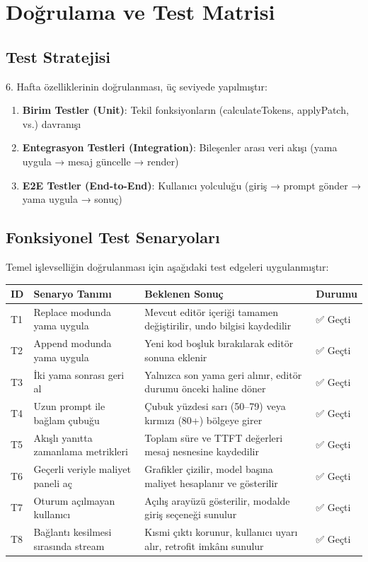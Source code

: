 \documentclass[12pt,a4paper]{article}
\begin{document}
\section{Doğrulama ve Test Matrisi}

\subsection{Test Stratejisi}

6. Hafta özelliklerinin doğrulanması, üç seviyede yapılmıştır:
\begin{enumerate}[leftmargin=*]
  \item \textbf{Birim Testler (Unit)}: Tekil fonksiyonların (calculateTokens, applyPatch, vs.) davranışı
  \item \textbf{Entegrasyon Testleri (Integration)}: Bileşenler arası veri akışı (yama uygula → mesaj güncelle → render)
  \item \textbf{E2E Testler (End-to-End)}: Kullanıcı yolculuğu (giriş → prompt gönder → yama uygula → sonuç)
\end{enumerate}

\subsection{Fonksiyonel Test Senaryoları}

Temel işlevselliğin doğrulanması için aşağıdaki test edgeleri uygulanmıştır:

\begin{longtable}{@{} P{0.9cm} P{3.8cm} P{4.8cm} P{2.0cm} @{}}
\toprule
ID & Senaryo Tanımı & Beklenen Sonuç & Durumu \\
\midrule
T1 & Replace modunda yama uygula & Mevcut editör içeriği tamamen değiştirilir, undo bilgisi kaydedilir & ✅ Geçti \\
T2 & Append modunda yama uygula & Yeni kod boşluk bırakılarak editör sonuna eklenir & ✅ Geçti \\
T3 & İki yama sonrası geri al & Yalnızca son yama geri alınır, editör durumu önceki haline döner & ✅ Geçti \\
T4 & Uzun prompt ile bağlam çubuğu & Çubuk yüzdesi sarı (50--79) veya kırmızı (80+) bölgeye girer & ✅ Geçti \\
T5 & Akışlı yanıtta zamanlama metrikleri & Toplam süre ve TTFT değerleri mesaj nesnesine kaydedilir & ✅ Geçti \\
T6 & Geçerli veriyle maliyet paneli aç & Grafikler çizilir, model başına maliyet hesaplanır ve gösterilir & ✅ Geçti \\
T7 & Oturum açılmayan kullanıcı & Açılış arayüzü gösterilir, modalde giriş seçeneği sunulur & ✅ Geçti \\
T8 & Bağlantı kesilmesi sırasında stream & Kısmi çıktı korunur, kullanıcı uyarı alır, retrofit imkânı sunulur & ✅ Geçti \\
\bottomrule
\end{longtable}
\end{document}
